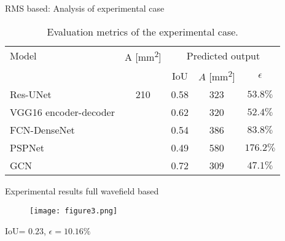 \documentclass[10pt,aspectratio=169]{beamer} %
\begin{document}
\begin{frame}{RMS based: Analysis of experimental case}
	\begin{table}[!ht]
		\centering
		\caption{Evaluation metrics of the experimental case.}
		\label{tab:rms_exp_case}
		\begin{tabular}{l@{\ }cccc}
			\toprule
			\multicolumn{1}{l}{Model} & \multicolumn{1}{c}{A [mm\textsuperscript{2}]} & \multicolumn{3}{c}{Predicted output} \\ 
			\cmidrule(lr){3-5} & & \multicolumn{1}{c}{IoU} & \multicolumn{1}{c}{\(\hat{A}\) [mm\textsuperscript{2}]} & \(\epsilon\) \\ \midrule
			Res-UNet & \multicolumn{1}{c}{210} & \multicolumn{1}{c}{0.58} & \multicolumn{1}{c}{323}  & \(53.8\%\) \\ 
			VGG16 encoder-decoder &  & \multicolumn{1}{c}{0.62} & \multicolumn{1}{c}{320} & \(52.4\%\) 
			\\ 
			FCN-DenseNet &  & \multicolumn{1}{c}{0.54} & \multicolumn{1}{c}{386} & \(83.8\%\) \\ 
			PSPNet &  & \multicolumn{1}{c}{0.49} & \multicolumn{1}{c}{580} & \(176.2\%\) 
			\\ 
			GCN &  & \multicolumn{1}{c}{0.72} & \multicolumn{1}{c}{309} & \(47.1\%\) 
			\\ 
			\bottomrule
		\end{tabular}		
	\end{table}
\end{frame}

\setcounter{subfigure}{0}
\begin{frame}{Experimental results full wavefield based}
	\begin{minipage}[ct]{0.5\textwidth}
	\begin{figure}
		\centering
		\texttt{[image: figure3.png]}
	\end{figure}
	\end{minipage}
	\hfill
	\begin{minipage}[t]{0.4\textwidth}
		\centering
		\par\medskip
		\qquad
		IoU= $0.23$, $\epsilon=10.16\%$
	\end{minipage}
\end{frame}
\end{document}
